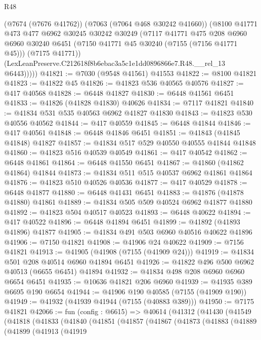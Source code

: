 \begin{lexlean}{R48}
\begin{coremodule}
          (@7674 (@7676 @41762))
          (@7063 (@7064 @468 @30242 @41660))
          (@8100
            @41771
            @473
            @477
            @6962
            @30245
            @30242
            @30249
            (@7117
              @41771
              @475
              @208
              @6960
              @6960
              @30240
              @6451
              (@7150 @41771 @45 @30240 (@7155 (@7156 @41771 @45)))
              (@7175 @41771))
            (LexLeanPreserve.C212618f8b6ebac3a5c1e1dd0896866e7.R48.__rel_13 @6443)))))
@41821 := @7030 (@9548 @41561) @41553
@41822 := @8100 @41821
@41823 := @41822 @45
@41826 := @41823 @536 @40565 @40576
@41827 := @417 @40568
@41828 := @6448 @41827
@41830 := @6448 @41561 @6451
@41833 := @41826 (@41828 @41830) @40626
@41834 := @7117 @41821
@41840 := @41834 @531 @535 @40563 @6962 @41827 @41830
@41843 := @41823 @530 @40556 @40562
@41844 := @417 @40559
@41845 := @6448 @41844
@41846 := @417 @40561
@41848 := @6448 @41846 @6451
@41851 := @41843 (@41845 @41848) @41827
@41857 := @41834 @517 @529 @40550 @40555 @41844 @41848
@41860 := @41823 @516 @40539 @40549
@41861 := @417 @40542
@41862 := @6448 @41861
@41864 := @6448 @41550 @6451
@41867 := @41860 (@41862 @41864) @41844
@41873 := @41834 @511 @515 @40537 @6962 @41861 @41864
@41876 := @41823 @510 @40526 @40536
@41877 := @417 @40529
@41878 := @6448 @41877
@41880 := @6448 @41431 @6451
@41883 := @41876 (@41878 @41880) @41861
@41889 := @41834 @505 @509 @40524 @6962 @41877 @41880
@41892 := @41823 @504 @40517 @40523
@41893 := @6448 @40622
@41894 := @417 @40522
@41896 := @6448 @41894 @6451
@41899 := @41892 (@41893 @41896) @41877
@41905 := @41834 @491 @503 @6960 @40516 @40622 @41896
@41906 := @7150 @41821
@41908 := @41906 @24 @40622
@41909 := @7156 @41821
@41913 := @41905 (@41908 (@7155 (@41909 @24)))
@41919 := @41834 @501 @208 @40514 @6960 @41894 @6451
@41926 := @41822 @496 @500 @6962 @40513 (@6655 @6451) @41894
@41932 := @41834 @498 @208 @6960 @6960 @6654 @6451
@41935 := @10636 @41821 @206 @6960
@41939 := @41935 @389 @6695 @190 @6654
@41944 := @41906 @190 @40585 (@7155 (@41909 @190))
@41949 := @41932 (@41939 @41944 (@7155 (@40883 @389)))
@41950 := @7175 @41821
@42066 := fun (config : @6615) =>
  @40614
    (@41312
      (@41430
        (@41549
          (@41818
            (@41833
              (@41840
                (@41851
                  (@41857
                    (@41867
                      (@41873
                        (@41883
                          (@41889
                            (@41899
                              (@41913
                                (@41919

\end{coremodule}
\end{lexlean}
